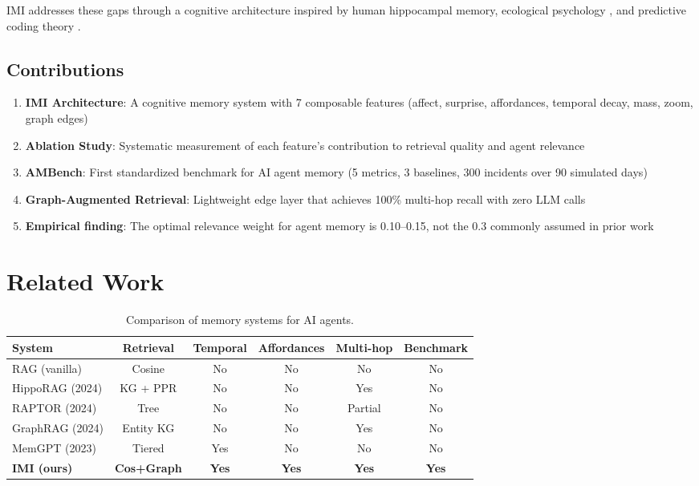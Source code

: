 \documentclass[11pt]{article}
\begin{document}
IMI addresses these gaps through a cognitive architecture inspired by human
hippocampal memory, ecological psychology \citep{gibson1979}, and predictive
coding theory \citep{rao1999}.

\subsection{Contributions}

\begin{enumerate}
  \item \textbf{IMI Architecture}: A cognitive memory system with 7 composable features
    (affect, surprise, affordances, temporal decay, mass, zoom, graph edges)
  \item \textbf{Ablation Study}: Systematic measurement of each feature's contribution
    to retrieval quality and agent relevance
  \item \textbf{AMBench}: First standardized benchmark for AI agent memory (5 metrics,
    3 baselines, 300 incidents over 90 simulated days)
  \item \textbf{Graph-Augmented Retrieval}: Lightweight edge layer that achieves 100\%
    multi-hop recall with zero LLM calls
  \item \textbf{Empirical finding}: The optimal relevance weight for agent memory is
    0.10--0.15, not the 0.3 commonly assumed in prior work
\end{enumerate}

\section{Related Work}

\begin{table}[h]
\centering
\small
\begin{tabular}{lccccc}
\toprule
System & Retrieval & Temporal & Affordances & Multi-hop & Benchmark \\
\midrule
RAG (vanilla) & Cosine & No & No & No & No \\
HippoRAG (2024) & KG + PPR & No & No & Yes & No \\
RAPTOR (2024) & Tree & No & No & Partial & No \\
GraphRAG (2024) & Entity KG & No & No & Yes & No \\
MemGPT (2023) & Tiered & Yes & No & No & No \\
\textbf{IMI (ours)} & \textbf{Cos+Graph} & \textbf{Yes} & \textbf{Yes} & \textbf{Yes} & \textbf{Yes} \\
\bottomrule
\end{tabular}
\caption{Comparison of memory systems for AI agents.}
\label{tab:related}
\end{table}
\end{document}
